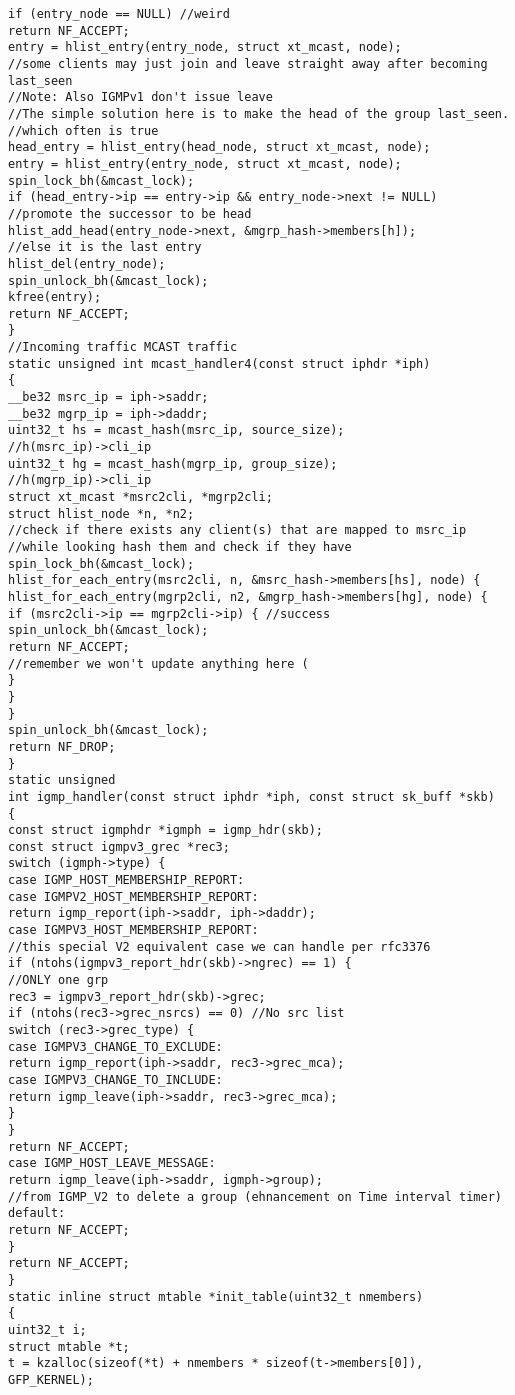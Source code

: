 \begin{verbatim}
if (entry_node == NULL) //weird
return NF_ACCEPT;
entry = hlist_entry(entry_node, struct xt_mcast, node);
//some clients may just join and leave straight away after becoming last_seen
//Note: Also IGMPv1 don't issue leave
//The simple solution here is to make the head of the group last_seen.
//which often is true
head_entry = hlist_entry(head_node, struct xt_mcast, node);
entry = hlist_entry(entry_node, struct xt_mcast, node);
spin_lock_bh(&mcast_lock);
if (head_entry->ip == entry->ip && entry_node->next != NULL)
//promote the successor to be head
hlist_add_head(entry_node->next, &mgrp_hash->members[h]);
//else it is the last entry
hlist_del(entry_node);
spin_unlock_bh(&mcast_lock);
kfree(entry);
return NF_ACCEPT;
}
//Incoming traffic MCAST traffic
static unsigned int mcast_handler4(const struct iphdr *iph)
{
__be32 msrc_ip = iph->saddr;
__be32 mgrp_ip = iph->daddr;
uint32_t hs = mcast_hash(msrc_ip, source_size);
//h(msrc_ip)->cli_ip
uint32_t hg = mcast_hash(mgrp_ip, group_size);
//h(mgrp_ip)->cli_ip
struct xt_mcast *msrc2cli, *mgrp2cli;
struct hlist_node *n, *n2;
//check if there exists any client(s) that are mapped to msrc_ip
//while looking hash them and check if they have
spin_lock_bh(&mcast_lock);
hlist_for_each_entry(msrc2cli, n, &msrc_hash->members[hs], node) {
hlist_for_each_entry(mgrp2cli, n2, &mgrp_hash->members[hg], node) {
if (msrc2cli->ip == mgrp2cli->ip) { //success
spin_unlock_bh(&mcast_lock);
return NF_ACCEPT;
//remember we won't update anything here (
}
}
}
spin_unlock_bh(&mcast_lock);
return NF_DROP;
}
static unsigned
int igmp_handler(const struct iphdr *iph, const struct sk_buff *skb)
{
const struct igmphdr *igmph = igmp_hdr(skb);
const struct igmpv3_grec *rec3;
switch (igmph->type) {
case IGMP_HOST_MEMBERSHIP_REPORT:
case IGMPV2_HOST_MEMBERSHIP_REPORT:
return igmp_report(iph->saddr, iph->daddr);
case IGMPV3_HOST_MEMBERSHIP_REPORT:
//this special V2 equivalent case we can handle per rfc3376
if (ntohs(igmpv3_report_hdr(skb)->ngrec) == 1) {
//ONLY one grp
rec3 = igmpv3_report_hdr(skb)->grec;
if (ntohs(rec3->grec_nsrcs) == 0) //No src list
switch (rec3->grec_type) {
case IGMPV3_CHANGE_TO_EXCLUDE:
return igmp_report(iph->saddr, rec3->grec_mca);
case IGMPV3_CHANGE_TO_INCLUDE:
return igmp_leave(iph->saddr, rec3->grec_mca);
}
}
return NF_ACCEPT;
case IGMP_HOST_LEAVE_MESSAGE:
return igmp_leave(iph->saddr, igmph->group);
//from IGMP_V2 to delete a group (ehnancement on Time interval timer)
default:
return NF_ACCEPT;
}
return NF_ACCEPT;
}
static inline struct mtable *init_table(uint32_t nmembers)
{
uint32_t i;
struct mtable *t;
t = kzalloc(sizeof(*t) + nmembers * sizeof(t->members[0]), GFP_KERNEL);

\end{verbatim}
